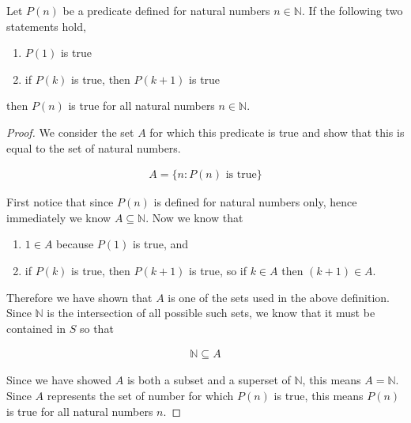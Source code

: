 \vspace{\baselineskip}
\begin{theorem}
	Let $P(n)$ be a predicate defined for natural numbers $n \in \mathbb{N}$. If the following two statements hold,
	
	\vspace{\baselineskip}
	\begin{enumerate}
		\item $P(1)$ is true
		\item if $P(k)$ is true, then $P(k + 1)$ is true
	\end{enumerate}
	\vspace{\baselineskip}

	then $P(n)$ is true for all natural numbers $n \in \mathbb{N}$.
\end{theorem}
\begin{proof}
	We consider the set $A$ for which this predicate is true and show that this is equal to the set of natural numbers.
	
	\begin{align*}
		A = \{ n : P(n) \text{ is true} \}
	\end{align*}
	
	First notice that since $P(n)$ is defined for natural numbers only, hence immediately we know $A \subseteq \mathbb{N}$. Now we know that
	
	\vspace{\baselineskip}
	\begin{enumerate}
		\item $1 \in A$ because $P(1)$ is true, and
		\item if $P(k)$ is true, then $P(k + 1)$ is true, so if $k \in A$ then $(k + 1) \in A$.
	\end{enumerate}
	\vspace{\baselineskip}

	Therefore we have shown that $A$ is one of the sets used in the above definition. Since $\mathbb{N}$ is the intersection of all possible such sets, we know that it must be contained in $S$ so that
	
	\begin{align*}
		\mathbb{N} \subseteq A
	\end{align*}
	
	Since we have showed $A$ is both a subset and a superset of $\mathbb{N}$, this means $A = \mathbb{N}$. Since $A$ represents the set of number for which $P(n)$ is true, this means $P(n)$ is true for all natural numbers $n$.
\end{proof}
\vspace{\baselineskip}


